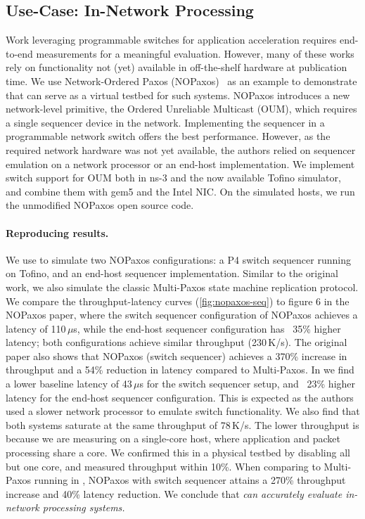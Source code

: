 \subsection{Use-Case: In-Network Processing}
\label{ssec:eval:nopaxos}
Work leveraging programmable switches for application acceleration
requires end-to-end measurements for a meaningful evaluation.
%
However, many of these works rely on functionality not (yet) available
in off-the-shelf hardware at publication time.
%
We use Network-Ordered Paxos (NOPaxos)~\cite{li:nopaxos} as an example
to demonstrate that \sysname can serve as a virtual testbed for such
systems.
%
NOPaxos introduces a new network-level primitive, the Ordered
Unreliable Multicast (OUM), which requires a single sequencer device
in the network.
%
Implementing the sequencer in a programmable network switch offers the best
performance.
%
However, as the required network hardware was not yet available, the authors
relied on sequencer emulation on a network processor or an end-host
implementation.
%
We implement switch support for OUM both in ns-3 and the now available Tofino
simulator, and combine them with gem5 and the Intel NIC.
%
On the simulated hosts, we run the unmodified NOPaxos open source code.

\paragraph{Reproducing results.}
We use \sysname to simulate two NOPaxos configurations: a P4 switch sequencer
running on Tofino, and an end-host sequencer implementation.
%
Similar to the original work, we also simulate the classic Multi-Paxos state
machine replication protocol.
%
We compare the throughput-latency curves (\autoref{fig:nopaxos-seq}) to figure 6
in the NOPaxos paper, where the switch sequencer configuration of NOPaxos achieves a
latency of 110\,$\mu$s, while the end-host sequencer configuration has ~35\%
higher latency; both configurations achieve similar throughput (230\,K/s).
%
The original paper also shows that NOPaxos (switch sequencer) achieves a
370\% increase in throughput and a 54\% reduction in latency compared to
Multi-Paxos.
%
In \sysname we find a lower baseline latency of 43\,$\mu$s for the switch
sequencer setup, and ~23\% higher latency for the end-host sequencer
configuration.
%
This is expected as the authors used a slower network processor
to emulate switch functionality.
%
We also find that both systems saturate at the same throughput of 78\,K/s.
%
The lower throughput is because we are measuring on a single-core
host, where application and packet processing share a core.
%
We confirmed this in a physical testbed by disabling all but one core,
and measured throughput within 10\%.
%
When comparing to Multi-Paxos running in \sysname, NOPaxos with switch sequencer
attains a 270\% throughput increase and 40\% latency reduction.
We conclude that \emph{\sysname can accurately evaluate in-network processing systems.}

